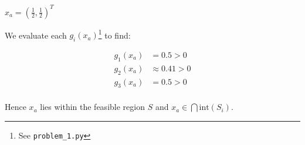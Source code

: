 $ x_a = \left(\frac{1}{2}, \frac{1}{2}\right)^T$

\begin{solution}
  We evaluate each $g_i(x_a)$\footnote{
    See \texttt{problem\_1.py}
    } to find:

  \begin{align*}
    g_1(x_a) &= 0.5 > 0 \\
    g_2(x_a) &\approx 0.41 > 0 \\
    g_3(x_a) &= 0.5 > 0 \\
  \end{align*}

  Hence $x_a$ lies within the feasible region $S$ and $x_a \in \bigcap{\text{int}(S_i)}$.
  \ \\
\end{solution}